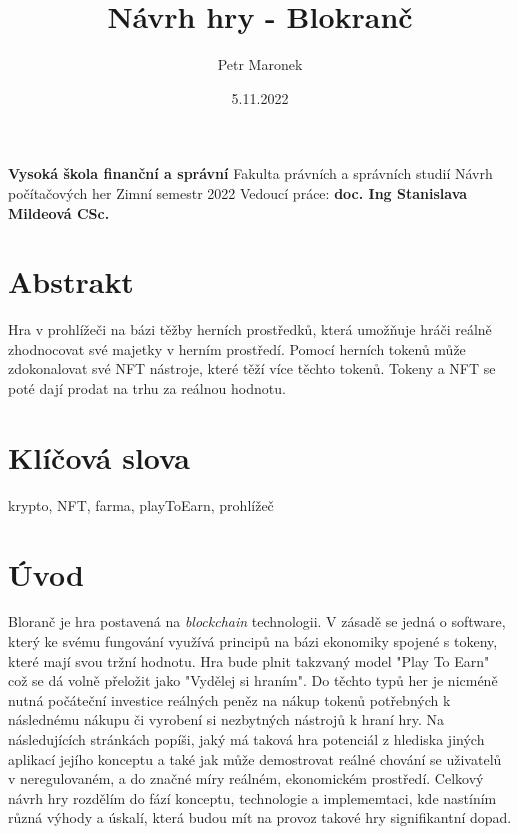 \documentclass{article}
\title{Návrh hry - Blokranč}
\author{Petr Maronek}
\date{5.11.2022}
\begin{document}
	\begin{spacing}{1.15}
		\rmfamily
		\maketitle
		\begin{center}
			\textbf{Vysoká škola finanční a správní}\linebreak
			Fakulta právních a správních studií\linebreak
			Návrh počítačových her\linebreak
			Zimní semestr 2022\linebreak
			Vedoucí práce: \textbf{doc. Ing Stanislava Mildeová CSc.}
		\end{center}
		\pagebreak
			
		\section*{Abstrakt}
		Hra v prohlížeči na bázi těžby herních prostředků, která umožňuje hráči
        reálně zhodnocovat své majetky v herním prostředí. Pomocí herních tokenů
        může zdokonalovat své NFT nástroje, které těží více těchto tokenů.
        Tokeny a NFT se poté dají prodat na trhu za reálnou hodnotu.
				
		\section*{Klíčová slova}
		krypto, NFT, farma, playToEarn, prohlížeč
		\pagebreak
		    
		\section*{Úvod}
		Bloranč je hra postavená na \textit{blockchain} technologii. V zásadě se
        jedná o software, který ke svému fungování využívá principů na bázi
        ekonomiky spojené s tokeny, které mají svou tržní hodnotu. Hra bude
        plnit takzvaný model "Play To Earn" což se dá volně přeložit jako
        "Vydělej si hraním". Do těchto typů her je nicméně nutná počáteční
        investice reálných peněz na nákup tokenů potřebných k následnému nákupu 
        či vyrobení si nezbytných nástrojů k hraní hry. Na následujících
        stránkách popíši, jaký má taková hra potenciál z hlediska jiných
        aplikací jejího konceptu a také jak může demostrovat reálné chování se 
        uživatelů v neregulovaném, a do značné míry reálném, ekonomickém
        prostředí. Celkový návrh hry rozdělím do fází konceptu, technologie a
        implememtaci, kde nastíním různá výhody a úskalí, která budou mít na
        provoz takové hry signifikantní dopad. 
		

\end{spacing}
\end{document}
